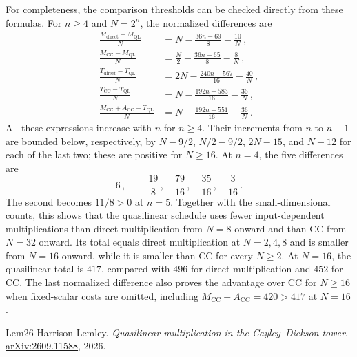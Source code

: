 \documentclass[11pt,reqno]{amsart}
\numberwithin{equation}{section}
\begin{document}
For completeness, the comparison thresholds can be checked directly
from these formulas. For $n\ge4$ and $N=2^n$, the normalized differences
are
\[
\begin{aligned}
\frac{M_{\mathrm{direct}}-M_{\mathrm{QL}}}{N}
 &=N-\frac{36n-69}{8}-\frac{10}{N}\,,\\
\frac{M_{\mathrm{CC}}-M_{\mathrm{QL}}}{N}
 &=\frac N2-\frac{36n-65}{8}-\frac8N\,,\\
\frac{T_{\mathrm{direct}}-T_{\mathrm{QL}}}{N}
 &=2N-\frac{240n-567}{16}-\frac{40}{N}\,,\\
\frac{T_{\mathrm{CC}}-T_{\mathrm{QL}}}{N}
 &=N-\frac{192n-583}{16}-\frac{36}{N}\,,\\
\frac{M_{\mathrm{CC}}+A_{\mathrm{CC}}-T_{\mathrm{QL}}}{N}
 &=N-\frac{192n-551}{16}-\frac{36}{N}\,.
\end{aligned}
\]
All these expressions increase with $n$ for $n\ge4$. Their increments
from $n$ to $n+1$ are bounded below, respectively, by
$N-9/2$, $N/2-9/2$, $2N-15$, and $N-12$ for each of the last two;
these are positive for $N\ge16$. At $n=4$, the five differences are
\[
6\,,\quad -\frac{19}{8}\,,\quad \frac{79}{16}\,,\quad
\frac{35}{16}\,,\quad \frac3{16}\,.
\]
The second becomes $11/8>0$ at $n=5$. Together with the small-dimensional
counts, this shows that the quasilinear schedule uses fewer
input-dependent multiplications than direct multiplication from $N=8$
onward and than CC from $N=32$ onward. Its total equals direct
multiplication at $N=2,4,8$ and is smaller from $N=16$ onward, while it
is smaller than CC for every $N\ge2$. At $N=16$, the quasilinear total
is $417$, compared with $496$ for direct multiplication and $452$ for
CC. The last normalized difference also proves the advantage over CC
for $N\ge16$ when fixed-scalar costs are omitted, including
$M_{\mathrm{CC}}+A_{\mathrm{CC}}=420>417$ at $N=16$.


\begin{thebibliography}{Lem26}
Harrison Lemley.
\emph{Quasilinear multiplication in the Cayley--Dickson tower}.
\href{https://arxiv.org/abs/2609.11588}{arXiv:2609.11588}, 2026.
\end{thebibliography}
\end{document}
